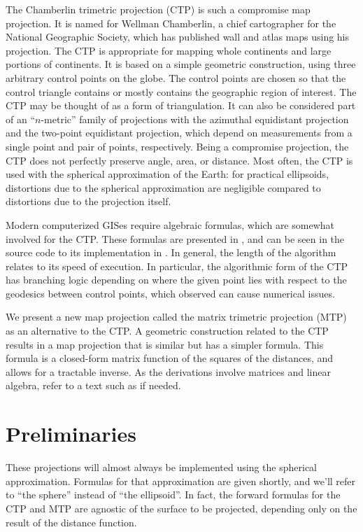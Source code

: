 \documentclass[]{interact}
\begin{document}
The Chamberlin trimetric projection (CTP) is such a compromise map projection.
It is named for Wellman Chamberlin, a chief cartographer for the National
Geographic Society, which has published wall and atlas maps using his
projection. \citep{christensen} The CTP is appropriate for mapping whole
continents and large portions of continents. It is based on a simple geometric
construction, using three arbitrary control points on the globe. The control
points are chosen so that the control triangle contains or mostly contains the
geographic region of interest. The CTP may be thought of as a form of
triangulation. It can also be considered part of an ``$n$-metric'' family of
projections with the azimuthal equidistant projection and the two-point
equidistant projection, which depend on measurements from a single point and
pair of points, respectively. \citep{snyder87} Being a compromise projection,
the CTP does not perfectly preserve angle, area, or distance. Most often, the
CTP is used with the spherical approximation of the Earth: for practical
ellipsoids, distortions due to the spherical approximation are negligible
compared to distortions due to the projection itself.

Modern computerized GISes require algebraic formulas, which are somewhat
involved for the CTP. These formulas are presented in \citet{christensen},
and can be seen in the source code to its implementation in \citet{proj}.
In general, the length of the algorithm relates to its speed of execution.
In particular, the algorithmic form of the CTP has branching logic depending on
where the given point lies with respect to the geodesics between control points,
which \citet{christensen} observed can cause numerical issues.

We present a new map projection called the matrix trimetric projection
(MTP) as an alternative to the CTP. A geometric construction related to the
CTP results in a map projection that is similar but has a simpler formula. This
formula is a closed-form matrix function of the squares of the distances, and
allows for a tractable inverse. As the derivations involve matrices and linear
algebra, refer to a text such as \citet{strang80} if needed.

\section{Preliminaries}
These projections will almost always be implemented using the spherical
approximation. Formulas for that approximation are given shortly, and we'll
refer to ``the sphere'' instead of ``the ellipsoid''. In fact, the forward
formulas for the CTP and MTP are agnostic of the surface to be projected,
depending only on the result of the distance function.
\end{document}
